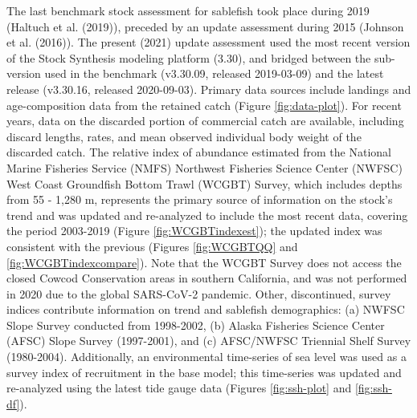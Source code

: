 \documentclass[11pt,
  english,
  a4paper,
]{article}
\begin{document}
The last benchmark stock assessment for sablefish took place during 2019 ({Haltuch et al. (2019)\leavevmode\tagmcend\tagstructend}), preceded by an update assessment during 2015 ({Johnson et al. (2016)\leavevmode\tagmcend\tagstructend}). The present (2021) update assessment used the most recent version of the Stock Synthesis modeling platform (3.30), and bridged between the sub-version used in the benchmark (v3.30.09, released 2019-03-09) and the latest release (v3.30.16, released 2020-09-03). Primary data sources include landings and age-composition data from the retained catch (Figure \ref{fig:data-plot}). For recent years, data on the discarded portion of commercial catch are available, including discard lengths, rates, and mean observed individual body weight of the discarded catch. The relative index of abundance estimated from the National Marine Fisheries Service (NMFS) Northwest Fisheries Science Center (NWFSC) West Coast Groundfish Bottom Trawl (WCGBT) Survey, which includes depths from 55 - 1,280 m, represents the primary source of information on the stock's trend and was updated and re-analyzed to include the most recent data, covering the period 2003-2019 (Figure \ref{fig:WCGBTindexest}); the updated index was consistent with the previous (Figures \ref{fig:WCGBTQQ} and \ref{fig:WCGBTindexcompare}). Note that the WCGBT Survey does not access the closed Cowcod Conservation areas in southern California, and was not performed in 2020 due to the global SARS-CoV-2 pandemic. Other, discontinued, survey indices contribute information on trend and sablefish demographics: (a) NWFSC Slope Survey conducted from 1998-2002, (b) Alaska Fisheries Science Center (AFSC) Slope Survey (1997-2001), and (c) AFSC/NWFSC Triennial Shelf Survey (1980-2004). Additionally, an environmental time-series of sea level was used as a survey index of recruitment in the base model; this time-series was updated and re-analyzed using the latest tide gauge data (Figures \ref{fig:ssh-plot} and \ref{fig:ssh-df}).

\leavevmode\tagmcend\tagstructend\par

\end{document}

